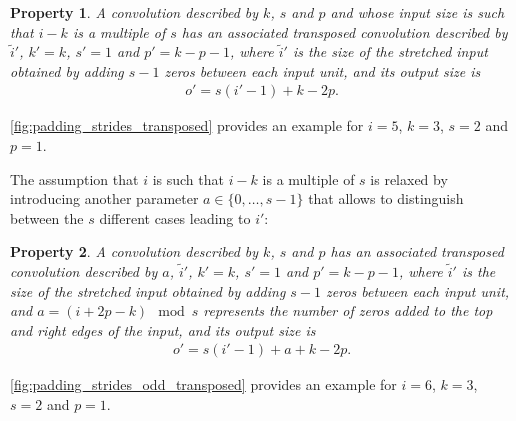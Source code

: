 \documentclass{report}
\newtheorem{prop}{Property}
\begin{document}
\begin{prop}\label{prop:padding_strides_transposed}
A convolution described by $k$, $s$ and $p$ and whose input size is such
that $i - k$ is a multiple of $s$ has an associated transposed convolution
described by $\tilde{i}'$, $k' = k$, $s' = 1$ and $p' = k - p - 1$, where
$\tilde{i}'$ is the size of the stretched input obtained by adding $s - 1$ zeros
between each input unit, and its output size is
\begin{equation*}
\begin{split}
    o' = s (i' - 1) + k - 2p.
\end{split}
\end{equation*}
\end{prop}

\autoref{fig:padding_strides_transposed} provides an example for $i = 5$, $k =
3$, $s = 2$ and $p = 1$.

The assumption that $i$ is such that $i - k$ is a multiple of $s$ is relaxed by
introducing another parameter $a \in \{0, \ldots, s - 1\}$ that allows to
distinguish between the $s$ different cases leading to $i'$:

\begin{prop}\label{prop:padding_strides_transposed_odd}
A convolution described by $k$, $s$ and $p$ has an associated transposed
convolution described by $a$, $\tilde{i}'$, $k' = k$, $s' = 1$ and $p' = k - p -
1$, where $\tilde{i}'$ is the size of the stretched input obtained by adding $s
- 1$ zeros between each input unit, and $a = (i + 2p - k) \mod s$ represents the
number of zeros added to the top and right edges of the input, and its output
size is
\begin{equation*}
\begin{split}
    o' = s (i' - 1) + a + k - 2p.
\end{split}
\end{equation*}
\end{prop}

\autoref{fig:padding_strides_odd_transposed} provides an example for $i = 6$, $k
= 3$, $s = 2$ and $p = 1$.
\end{document}
